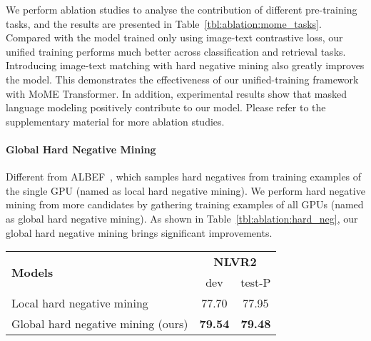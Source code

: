 \documentclass{article}
\newcommand\mome{\textsc{MoME}}
\begin{document}
We perform ablation studies to analyse the contribution of different pre-training tasks, and the results are presented in Table~\ref{tbl:ablation:mome_tasks}.
Compared with the model trained only using image-text contrastive loss, our unified training performs much better across classification and retrieval tasks.
Introducing image-text matching with hard negative mining also greatly improves the model.
This demonstrates the effectiveness of our unified-training framework with \mome{} Transformer.
In addition, experimental results show that masked language modeling positively contribute to our model.
Please refer to the supplementary material for more ablation studies.

\paragraph{Global Hard Negative Mining}

Different from ALBEF~\cite{albef}, which samples hard negatives from training examples of the single GPU (named as local hard negative mining).
We perform hard negative mining from more candidates by gathering training examples of all GPUs (named as global hard negative mining).
As shown in Table~\ref{tbl:ablation:hard_neg}, 
our global hard negative mining brings significant improvements.


\begin{table*}[ht]
\centering
\small
\begin{tabular}{lcc}
\toprule
\multirow{2}{*}{\bf Models} &  \multicolumn{2}{c}{\bf NLVR2} \\
 & dev & test-P \\
\midrule
Local hard negative mining~\cite{albef} & 77.70 & 77.95 \\
Global hard negative mining (ours) & \bf 79.54 & \bf 79.48 \\
\bottomrule
\end{tabular}
\caption{
Global hard negative mining improves the model.
We perform experiments using 32 V100 GPUs. 
The batch size per GPU is 32, and the total batch size is 1024.
Local hard negative mining samples hard negatives from training examples of the single GPU (32 examples), while global hard negative mining uses training examples gathered from all GPUs as the candidates (1024 examples).
}
\label{tbl:ablation:hard_neg}
\end{table*}
\end{document}
